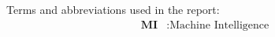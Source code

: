 
Terms and abbreviations used in the report:
\begin{align*}
    \textbf{MI} &: \text{Machine Intelligence} \\
\end{align*}
